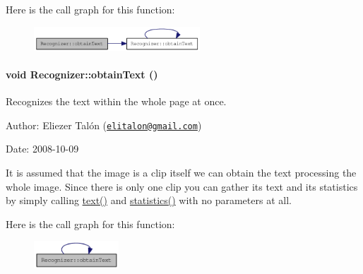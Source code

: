 Here is the call graph for this function:\nopagebreak
\begin{figure}[H]
\begin{center}
\leavevmode
\includegraphics[width=176pt]{class_recognizer_4b3b27b3746edcf831d142eddfb81f19_cgraph}
\end{center}
\end{figure}
\hypertarget{class_recognizer_008a0ea69a912ff54882dd20d18adcf9}{
\paragraph[{obtainText}]{\setlength{\rightskip}{0pt plus 5cm}void Recognizer::obtainText ()}\hfill}
\label{class_recognizer_008a0ea69a912ff54882dd20d18adcf9}


Recognizes the text within the whole page at once. 

\begin{Desc}
\item[Author:]Eliezer Talón (\href{mailto:elitalon@gmail.com}{\tt elitalon@gmail.com}) \end{Desc}
\begin{Desc}
\item[Date:]2008-10-09\end{Desc}
It is assumed that the image is a clip itself we can obtain the text processing the whole image. Since there is only one clip you can gather its text and its statistics by simply calling \hyperlink{class_recognizer_c5d20b511888a60a6c1a81c0a4206ec2}{text()} and \hyperlink{class_recognizer_8b38356d2741969e67cd6b4f507897ba}{statistics()} with no parameters at all. 

Here is the call graph for this function:\nopagebreak
\begin{figure}[H]
\begin{center}
\leavevmode
\includegraphics[width=90pt]{class_recognizer_008a0ea69a912ff54882dd20d18adcf9_cgraph}
\end{center}
\end{figure}


